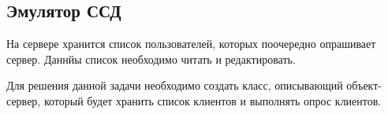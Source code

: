 % 
% 
% 
% 
% 
% 
% 
% 
% 
% 
% 
% 

\subsection{Эмулятор ССД}

На сервере хранится список пользователей, которых поочередно опрашивает сервер. Даннйы список необходимо читать и редактировать.

Для решения данной задачи необходимо создать класс, описывающий объект-сервер, который будет хранить список клиентов и выполнять опрос клиентов.

